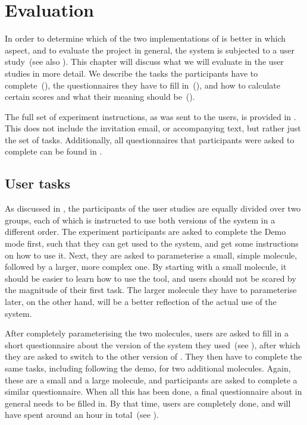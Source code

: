 \chapter{Evaluation}

In order to determine which of the two implementations of \oframp{} is better in which aspect, and to evaluate the project in general, the system is subjected to a user study~(see also ). This chapter will discuss what we will evaluate in the user studies in more detail. We describe the tasks the participants have to complete~(), the questionnaires they have to fill in~(), and how to calculate certain scores and what their meaning should be~().

The full set of experiment instructions, as was sent to the users, is provided in . This does not include the invitation email, or accompanying text, but rather just the set of tasks. Additionally, all questionnaires that participants were asked to complete can be found in .



\section{User tasks}
As discussed in , the participants of the user studies are equally divided over two groups, each of which is instructed to use both versions of the system in a different order. The experiment participants are asked to complete the Demo mode first, such that they can get used to the system, and get some instructions on how to use it. Next, they are asked to parameterise a small, simple molecule, followed by a larger, more complex one. By starting with a small molecule, it should be easier to learn how to use the tool, and users should not be scared by the magnitude of their first task. The larger molecule they have to parameterise later, on the other hand, will be a better reflection of the actual use of the system.

After completely parameterising the two molecules, users are asked to fill in a short questionnaire about the version of the system they used~(see ), after which they are asked to switch to the other version of \oframp. They then have to complete the same tasks, including following the demo, for two additional molecules. Again, these are a small and a large molecule, and participants are asked to complete a similar questionnaire. When all this has been done, a final questionnaire about \oframp{} in general needs to be filled in. By that time, users are completely done, and will have spent around an hour in total~(see ).

